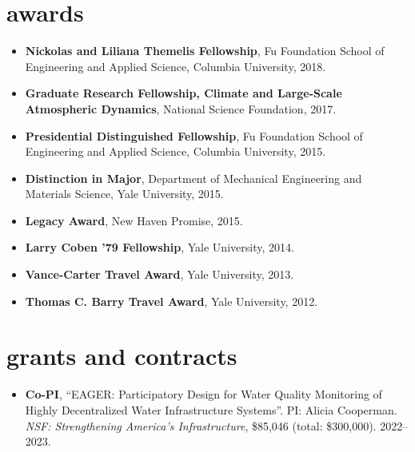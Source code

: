\documentclass[10pt,oneside]{article}
\begin{document}

\section{awards}

\mbox{}\vspace{-\dimexpr\baselineskip\relax}

\begin{itemize}[label={}]
  
  \item \textbf{Nickolas and Liliana Themelis Fellowship}, Fu Foundation School of Engineering and Applied Science, Columbia University, 2018.
        
  \item \textbf{Graduate Research Fellowship, Climate and Large-Scale Atmospheric Dynamics}, National Science Foundation, 2017.
        
  \item \textbf{Presidential Distinguished Fellowship}, Fu Foundation School of Engineering and Applied Science, Columbia University, 2015.
        
  \item \textbf{Distinction in Major}, Department of Mechanical Engineering and Materials Science, Yale University, 2015.
        
  \item \textbf{Legacy Award}, New Haven Promise, 2015.
        
  \item \textbf{Larry Coben ’79 Fellowship}, Yale University, 2014.
        
  \item \textbf{Vance-Carter Travel Award}, Yale University, 2013.
        
  \item \textbf{Thomas C. Barry Travel Award}, Yale University, 2012.
        
\end{itemize}



\section{grants and contracts}

\mbox{}\vspace{-\dimexpr\baselineskip\relax}

\begin{itemize}[label={}]
  
  \item \textbf{Co-PI}, \enquote{EAGER: Participatory Design for Water Quality Monitoring of Highly Decentralized Water Infrastructure Systems}.  PI: Alicia Cooperman. \textit{NSF: Strengthening America's Infrastructure}, \$85,046 (total: \$300,000). 2022--2023.
        
\end{itemize}
\end{document}
